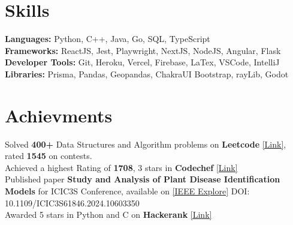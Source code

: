 \documentclass[]{Nikhil_Kadiyan_Resume}
\begin{document}

\section{Skills} 
\hrulefill

\pt \textbf{Languages:} Python, C++, Java, Go, SQL, TypeScript \\
\pt \textbf{Frameworks:} ReactJS, Jest, Playwright, NextJS, NodeJS, Angular, Flask\\
\pt \textbf{Developer Tools:}  Git, Heroku, Vercel, Firebase, LaTex, VSCode, IntelliJ\\
\pt \textbf{Libraries:} Prisma, Pandas, Geopandas, ChakraUI Bootstrap, rayLib, Godot\\

\sectionsep

\section{Achievments} 
\hrulefill

\pt Solved \textbf{400+} Data Structures and Algorithm problems on \textbf{Leetcode} \href{https://leetcode.com/anidnottaken/}{[Link]}, rated \textbf{1545} on contests.\\ 
\pt Achieved a highest Rating of \textbf{1708}, 3 stars in \textbf{Codechef} \href{https://www.codechef.com/users/nikhilcad}{[Link]} \\
\pt Published paper \textbf{Study and Analysis of Plant Disease Identification Models} for ICIC3S Conference, available on \href{https://ieeexplore.ieee.org/document/10603350}{[IEEE Explore]} DOI: 10.1109/ICIC3S61846.2024.10603350\\
\pt Awarded 5 stars in Python and C on \textbf{Hackerank} \href{https://www.hackerrank.com/nikhilcaddilac?hr_r=1}{[Link]}\\
\end{document}
